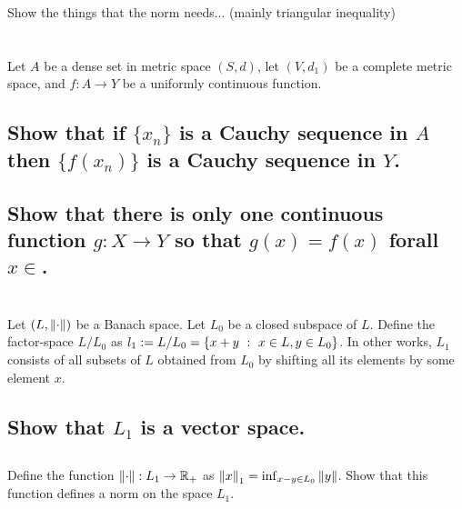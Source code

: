 \documentclass[]{article}
\newcommand{\R}{\mathbb{R}}
\newcommand{\st}{\ : \ }
\begin{document}
Show the things that the norm needs... (mainly triangular inequality)





\newpage
\section{}
Let $A$ be a dense set in metric space $(S,d)$, let $(V,d_1)$ be a complete metric space, and $f : A \to Y$ be a uniformly continuous function. 

\subsection{Show that if $\{x_n\}$ is a Cauchy sequence in $A$ then $\{f(x_n)\}$ is a Cauchy sequence in $Y$.}




\subsection{Show that there is only one continuous function $g : X \to Y$ so that $g(x) = f(x)$ forall $x \in $.}














\newpage
\section{}
Let $(L, \norm{\cdot})$ be a Banach space. 
Let $L_0$ be a closed subspace of $L$. 
Define the factor-space $L/L_0$ as $l_1 := L/L_0 = \qty{x + y \st x \in L, y \in L_0}$. 
In other works, $L_1$ consists of all subsets of $L$ obtained from $L_0$ by shifting all its elements by some element $x$. 

\subsection{Show that $L_1$ is a vector space.}


\subsection{}
Define the function $\norm{\cdot} : L_1 \to \R_{+}$ as $\norm{x}_1 = \inf_{x - y \in L_0} \norm{y}$. 
Show that this function defines a norm on the space $L_1$.
\end{document}
